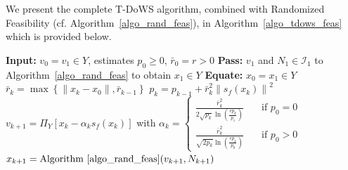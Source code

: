 \documentclass{article}
\theoremstyle{plain}
\theoremstyle{definition}
\theoremstyle{remark}
\begin{document}
We present the complete T-DoWS algorithm, combined with Randomized Feasibility (cf. Algorithm~\ref{algo_rand_feas}), in Algorithm~\ref{algo_tdows_feas} which is provided below.

%
\begin{algorithm}
\caption{T-DoWS with Randomized Feasibility}
\label{algo_tdows_feas}
\begin{algorithmic}[1]
\STATE \textbf{Input:} $v_0 = v_1 \in Y$, estimates $p_{0} \geq 0$, $\bar r_{0} = r > 0$
\STATE \textbf{Pass:} $v_1$ and $N_{1} \in \mathcal{I}_{1}$ to Algorithm~\ref{algo_rand_feas} to obtain $x_1 \in Y$
\STATE \textbf{Equate:} $x_0 = x_1 \in Y$
    \STATE $\bar{r}_k = \max\left\{ \|x_k - x_0\|, \bar{r}_{k-1} \right\}$
    \STATE $p_k = p_{k-1} + \bar{r}_k^2 \left\| s_f(x_k) \right\|^2$
    \STATE $v_{k+1} = \Pi_Y \left[ x_k - \alpha_k s_f(x_k) \right]$ with $\alpha_k = \begin{cases}
        \frac{\bar{r}_k^2}{2 \sqrt{p_k} \ln \left( \frac{e p_k}{p_1} \right)} \quad &\text{if $p_0 = 0$} \\
        \frac{\bar{r}_k^2}{\sqrt{2 p_k} \ln \left( \frac{e p_k}{p_0} \right)} \quad &\text{if $p_0 > 0$}
    \end{cases}$
    \STATE $x_{k+1} = \text{Algorithm~\ref{algo_rand_feas}}(v_{k+1}, N_{k+1})$
\ENDFOR
\end{algorithmic}
\end{algorithm}
%
%
\end{document}
